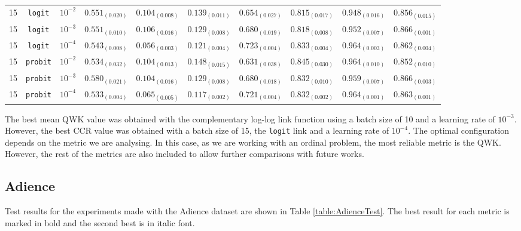 \documentclass[journal]{IEEEtran}
\begin{document}
\begin{table}[!t]
\begin{tabular}{c@{\hskip 0.15cm}c@{\hskip 0.15cm}c@{\hskip 0.15cm}c@{\hskip 0.30cm}c@{\hskip 0.20cm}c@{\hskip 0.20cm}c@{\hskip 0.20cm}c@{\hskip 0.20cm}c@{\hskip 0.20cm}c}
			15 & \texttt{logit} & $10^{-2}$ & $0.551_{(0.020)}$ & $0.104_{(0.008)}$ & $0.139_{(0.011)}$ & $0.654_{(0.027)}$ & $0.815_{(0.017)}$ & $0.948_{(0.016)}$ & $0.856_{(0.015)}$\\
			15 & \texttt{logit} & $10^{-3}$ & $0.551_{(0.010)}$ & $0.106_{(0.016)}$ & $0.129_{(0.008)}$ & $0.680_{(0.019)}$ & $0.818_{(0.008)}$ & $0.952_{(0.007)}$ & $\mathit{0.866_{(0.001)}}$\\
			15 & \texttt{logit} & $10^{-4}$ & $0.543_{(0.008)}$ & $0.056_{(0.003)}$ & $0.121_{(0.004)}$ & $\mathbf{0.723_{(0.004)}}$ & $0.833_{(0.004)}$ & $0.964_{(0.003)}$ & $0.862_{(0.004)}$\\
			15 & \texttt{probit} & $10^{-2}$ & $0.534_{(0.032)}$ & $0.104_{(0.013)}$ & $0.148_{(0.015)}$ & $0.631_{(0.038)}$ & $0.845_{(0.030)}$ & $0.964_{(0.010)}$ & $0.852_{(0.010)}$\\
			15 & \texttt{probit} & $10^{-3}$ & $\mathit{0.580_{(0.021)}}$ & $0.104_{(0.016)}$ & $0.129_{(0.008)}$ & $0.680_{(0.018)}$ & $0.832_{(0.010)}$ & $0.959_{(0.007)}$ & $0.866_{(0.003)}$\\
			15 & \texttt{probit} & $10^{-4}$ & $0.533_{(0.004)}$ & $0.065_{(0.005)}$ & $0.117_{(0.002)}$ & $\mathit{0.721_{(0.004)}}$ & $0.832_{(0.002)}$ & $0.964_{(0.001)}$ & $0.863_{(0.001)}$\\
			\hline
			\hline
		\end{tabular}
	\end{table}
	
	The best mean QWK value was obtained with the complementary log-log link function using a batch size of 10 and a learning rate of $10^{-3}$. However, the best CCR value was obtained with a batch size of 15, the \texttt{logit} link and a learning rate of $10^{-4}$. The optimal configuration depends on the metric we are analysing. In this case, as we are working with an ordinal problem, the most reliable metric is the QWK. However, the rest of the metrics are also included to allow further comparisons with future works.
	
	\subsection{Adience}
	\label{sect:adience}
	Test results for the experiments made with the Adience dataset are shown in Table \ref{table:AdienceTest}. The best result for each metric is marked in bold and the second best is in italic font.
	
\end{document}
